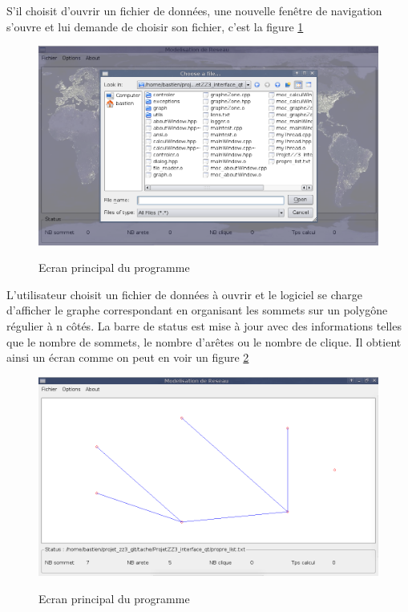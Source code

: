 S'il choisit d'ouvrir un fichier de donn\'ees, une nouvelle fen\^etre de navigation s'ouvre et lui demande de choisir son fichier, c'est la figure \ref{ecran_donnees}

\begin{figure}[ht]
\centering
 \fbox
 {
 \includegraphics[width=16cm]{./schema/capture_ecran_donnees.png}
 }
  \caption{\label{ecran_donnees}Ecran principal du programme}
\end{figure}

L'utilisateur choisit un fichier de donn\'ees \`a ouvrir et le logiciel se charge d'afficher le graphe correspondant en organisant les sommets sur un polyg\^one r\'egulier \`a n c\^ot\'es.
La barre de status est mise \`a jour avec des informations telles que le nombre de sommets, le nombre d'ar\^etes ou le nombre de clique. Il obtient ainsi un \'ecran comme on peut en voir un figure \ref{ecran_graph}

\begin{figure}[ht]
\centering
 \fbox
 {
 \includegraphics[width=16cm]{./schema/capture_ecran_graph.png}
 }
  \caption{\label{ecran_graph}Ecran principal du programme}
\end{figure}